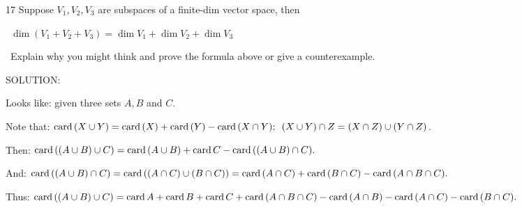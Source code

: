 \documentclass[a4paper, 11pt, UTF8]{article}
\def\card{\textup{card}\,}
\begin{document}
\begin{large}
{\timesbf\Large 17} {\timessl\Large 
Suppose $V_1,V_2,V_3$ are subspaces of a finite-dim vector space, then}\par\quad\,
$\dim(V_1+V_2+V_3)=\dim V_1+\dim V_2+\dim V_3$\par{}\quad\,
{\timessl\Large Explain why you might think and prove the formula above or give a counterexample.}\par
{\timesbf S\footnotesize{OLUTION:}}\par
{\timessl Looks like:} given three sets $A,B$ and $C$.\par
{\timessl Note that:} $\card(X\cup Y)=\card(X)+\card(Y)-\card(X\cap Y);\,\,\,(X\cup Y)\cap Z=(X\cap Z)\cup(Y\cap Z)$.\par
{\timessl Then:} $\card((A\cup B)\cup C)=\card(A\cup B)+\card C-\card((A\cup B)\cap C).$\par
{\timessl And:} $\card((A\cup B)\cap C)=\card((A\cap C)\cup(B\cap C))=\card(A\cap C)+\card(B\cap C)-\card(A\cap B\cap C).$\par
{\timessl Thus:} $\card((A\cup B)\cup C)=\card A+\card B+\card C+\card(A\cap B\cap C)-\card(A\cap B)-\card(A\cap C)-\card(B\cap C).$\par


\end{large}
\end{document}

